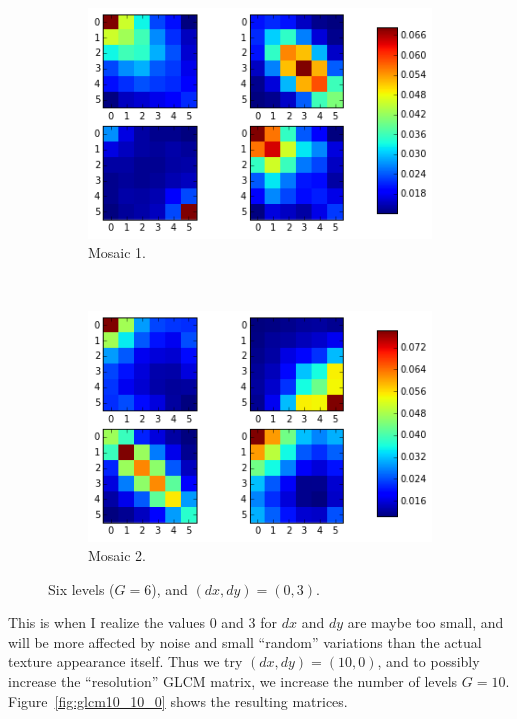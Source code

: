 \documentclass[a4paper]{article}
\begin{document}
\begin{figure}
    \centering
    \begin{subfigure}[b]{0.40\textwidth}
        \centering
        \includegraphics[width=\textwidth]{m1_0_3.png}
        \caption{%
            Mosaic 1.
        }
    \end{subfigure}
    ~
    \begin{subfigure}[b]{0.40\textwidth}
        \centering
        \includegraphics[width=\textwidth]{m2_0_3.png}
        \caption{%
            Mosaic 2.
        }
    \end{subfigure}
    \caption{%
        Six levels ($G = 6$), and $(dx, dy) = (0, 3)$.
    }
    \label{fig:glcm6_0_3}
\end{figure}

This is when I realize the values 0 and 3 for $dx$ and $dy$ are maybe
too small, and will be more affected by noise and small ``random''
variations than the actual texture appearance itself. Thus we try $(dx,
dy) = (10, 0)$, and to possibly increase the ``resolution'' GLCM matrix,
we increase the number of levels $G = 10$. Figure~\ref{fig:glcm10_10_0}
shows the resulting matrices.
\end{document}
